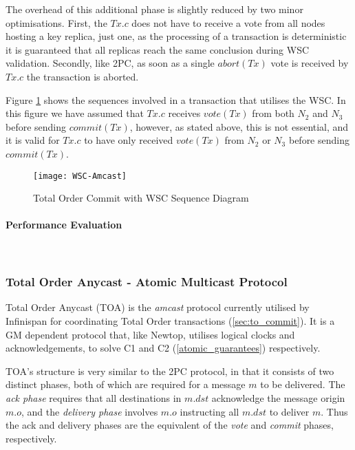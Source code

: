 			The overhead of this additional phase is slightly reduced by two minor optimisations.  First, the $Tx.c$ does not have to receive a vote from all nodes hosting a key replica, just one, as the processing of a transaction is deterministic it is guaranteed that all replicas reach the same conclusion during WSC validation.  Secondly, like 2PC, as soon as a single $abort(Tx)$ vote is received by $Tx.c$ the transaction is aborted.  
			
			Figure \ref{fig:total_order_wsc} shows the sequences involved in a transaction that utilises the WSC.  In this figure we have assumed that $Tx.c$ receives $vote(Tx)$ from both $N_2$ and $N_3$ before sending $commit(Tx)$, however, as stated above, this is not essential, and it is valid for $Tx.c$ to have only received $vote(Tx)$ from $N_2$ or $N_3$ before sending $commit(Tx)$.  
	        
	        \begin{figure}[htbp!] 
                \centering    
                \texttt{[image: WSC-Amcast]}
                \caption[Total Order Commit with Write Skew Check]{Total Order Commit with WSC Sequence Diagram}
                \label{fig:total_order_wsc}
            \end{figure}	      	
                        
            \paragraph{Performance Evaluation} \hspace{0pt} \\                          
                         
             
	        \subsubsection{Total Order Anycast - Atomic Multicast Protocol} \label{ssec:TOA_limations}
	        Total Order Anycast (TOA)\cite{Ruivo:2011:ETO:2120967.2121604} is the \emph{amcast} protocol currently utilised by Infinispan for coordinating Total Order transactions (\ref{sec:to_commit}).  It is a GM dependent protocol that, like Newtop\citep{Ezhilchelvan:1995:NFG:876885.880005}, utilises logical clocks and acknowledgements, to solve C1 and C2 (\ref{atomic_guarantees}) respectively.  
	        
			TOA's structure is very similar to the 2PC protocol, in that it consists of two distinct phases, both of which are required for a message $m$ to be delivered.  The \emph{ack phase} requires that all destinations in $m.dst$ acknowledge the message origin $m.o$, and the \emph{delivery phase} involves $m.o$ instructing all $m.dst$ to deliver $m$.  Thus the ack and delivery phases are the equivalent of the \emph{vote} and \emph{commit} phases, respectively.  
	        
